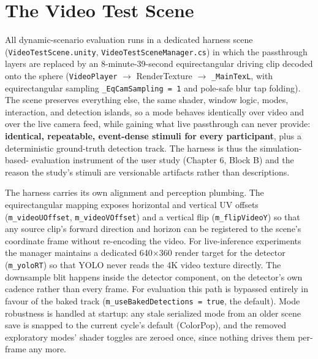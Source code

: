 
\section{The Video Test Scene}

All dynamic-scenario evaluation runs in a dedicated harness scene (\verb|VideoTestScene.unity|,
\verb|VideoTestSceneManager.cs|) in which the passthrough layers are replaced by an
8-minute-39-second equirectangular driving clip decoded onto the sphere (\verb|VideoPlayer| $\rightarrow$ RenderTexture $\rightarrow$ \verb|_MainTexL|,
with equirectangular sampling \verb|_EqCamSampling = 1| and pole-safe blur tap folding). The scene
preserves everything else, the same shader, window logic, modes, interaction, and detection islands,
so a mode behaves identically over video and over the live camera feed, while gaining what live
passthrough can never provide: \textbf{identical, repeatable, event-dense stimuli for every participant},
plus a deterministic ground-truth detection track. The harness is thus the simulation-based-
evaluation instrument of the user study (Chapter 6, Block B) and the reason the study's
stimuli are versionable artifacts rather than descriptions.

The harness carries its own alignment and perception plumbing. The equirectangular mapping exposes
horizontal and vertical UV offsets (\verb|m_videoUOffset|, \verb|m_videoVOffset|) and a vertical flip
(\verb|m_flipVideoY|) so that any source clip's forward direction and horizon can be registered to the
scene's coordinate frame without re-encoding the video. For live-inference experiments the manager
maintains a dedicated 640$\times$360 render target for the detector (\verb|m_yoloRT|) so that YOLO never reads
the 4K video texture directly. The downsample blit happens inside the detector component, on the
detector's own cadence rather than every frame. For evaluation this path is bypassed entirely in
favour of the baked track (\verb|m_useBakedDetections = true|, the default). Mode robustness is handled at
startup: any stale serialized mode from an older scene save is snapped to the current cycle's default
(ColorPop), and the removed exploratory modes' shader toggles are zeroed once, since nothing drives
them per-frame any more.


